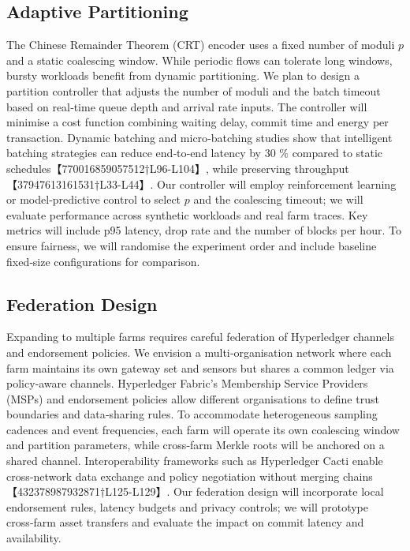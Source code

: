 \subsection{Adaptive Partitioning}
The Chinese Remainder Theorem (CRT) encoder uses a fixed number of moduli \(p\) and a
static coalescing window.  While periodic flows can tolerate long windows, bursty workloads
benefit from dynamic partitioning.  We plan to design a partition controller that adjusts
the number of moduli and the batch timeout based on real‑time queue depth and arrival rate
inputs.  The controller will minimise a cost function combining waiting delay, commit time
and energy per transaction.  Dynamic batching and micro‑batching studies show that
intelligent batching strategies can reduce end‑to‑end latency by 30 \% compared to static
schedules【770016859057512†L96-L104】, while preserving throughput【37947613161531†L33-L44】.
Our controller will employ reinforcement learning or model‑predictive control to select
\(p\) and the coalescing timeout; we will evaluate performance across synthetic workloads and
real farm traces.  Key metrics will include p95 latency, drop rate and the number of blocks
per hour.  To ensure fairness, we will randomise the experiment order and include baseline
fixed‑size configurations for comparison.

\subsection{Federation Design}
Expanding to multiple farms requires careful federation of Hyperledger channels and
endorsement policies.  We envision a multi‑organisation network where each farm maintains
its own gateway set and sensors but shares a common ledger via policy‑aware channels.
Hyperledger Fabric’s Membership Service Providers (MSPs) and endorsement policies allow
different organisations to define trust boundaries and data‑sharing rules.  To accommodate
heterogeneous sampling cadences and event frequencies, each farm will operate its own
coalescing window and partition parameters, while cross‑farm Merkle roots will be anchored
on a shared channel.  Interoperability frameworks such as Hyperledger Cacti enable
cross‑network data exchange and policy negotiation without merging chains【432378987932871†L125-L129】.
Our federation design will incorporate local endorsement rules, latency budgets and
privacy controls; we will prototype cross‑farm asset transfers and evaluate the impact on
commit latency and availability.

